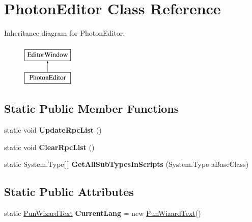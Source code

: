 \hypertarget{class_photon_editor}{}\section{Photon\+Editor Class Reference}
\label{class_photon_editor}
Inheritance diagram for Photon\+Editor\+:\begin{figure}[H]
\begin{center}
\leavevmode
\includegraphics[height=2.000000cm]{class_photon_editor}
\end{center}
\end{figure}
\subsection*{Static Public Member Functions}
\begin{DoxyCompactItemize}
\item 
static void {\bfseries Update\+Rpc\+List} ()\hypertarget{class_photon_editor_a2b113824952b620b9f866b19cb02bb9f}{}\label{class_photon_editor_a2b113824952b620b9f866b19cb02bb9f}

\item 
static void {\bfseries Clear\+Rpc\+List} ()\hypertarget{class_photon_editor_a7b6ed3bf9fe915eb2bcbb2145a60e8f2}{}\label{class_photon_editor_a7b6ed3bf9fe915eb2bcbb2145a60e8f2}

\item 
static System.\+Type\mbox{[}$\,$\mbox{]} {\bfseries Get\+All\+Sub\+Types\+In\+Scripts} (System.\+Type a\+Base\+Class)\hypertarget{class_photon_editor_ad4d13d2a6ea1da5d6b2a7a59547320ff}{}\label{class_photon_editor_ad4d13d2a6ea1da5d6b2a7a59547320ff}

\end{DoxyCompactItemize}
\subsection*{Static Public Attributes}
\begin{DoxyCompactItemize}
\item 
static \hyperlink{class_pun_wizard_text}{Pun\+Wizard\+Text} {\bfseries Current\+Lang} = new \hyperlink{class_pun_wizard_text}{Pun\+Wizard\+Text}()\hypertarget{class_photon_editor_addb01f74196c19993905e90bc0a32b50}{}\label{class_photon_editor_addb01f74196c19993905e90bc0a32b50}

\end{DoxyCompactItemize}
